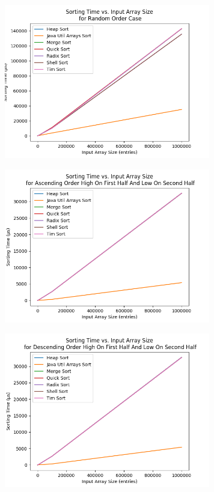 \begin{figure}[!htp]
\centering
\includegraphics[width=9cm]{figures/plots_without_BubbleSort_InsertionSort/sorting_time_vs_input_array_size_RandomOrderCase.png}
\end{figure}

\begin{figure}[!htp]
\centering
\includegraphics[width=9cm]{figures/plots_without_BubbleSort_InsertionSort/sorting_time_vs_input_array_size_AscendingOrderHighOnFirstHalfAndLowOnSecondHalf.png}
\end{figure}

\begin{figure}[!htp]
\centering
\includegraphics[width=9cm]{figures/plots_without_BubbleSort_InsertionSort/sorting_time_vs_input_array_size_DescendingOrderHighOnFirstHalfAndLowOnSecondHalf.png}
\end{figure}

